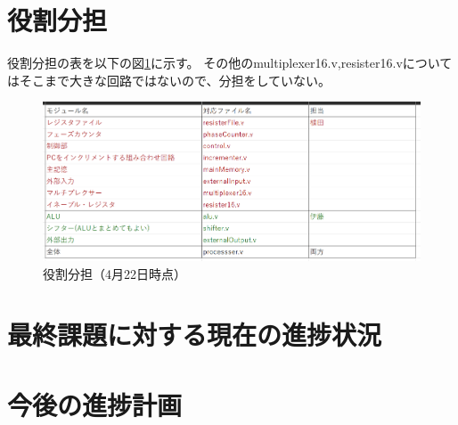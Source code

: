\documentclass[a4j,titlepage]{jarticle}
\begin{document}
\section{役割分担}

役割分担の表を以下の図\ref{rolesDivision0422}に示す。
その他のmultiplexer16.v,resister16.vについてはそこまで大きな回路ではないので、分担をしていない。



\begin{figure}[H]
    \begin{center}
        \includegraphics[scale = 0.5]{rolesDivision0422.png}
    \end{center}
    \caption{役割分担（4月22日時点）}
    \label{rolesDivision0422}
\end{figure}

\section{最終課題に対する現在の進捗状況}

\section{今後の進捗計画}
\end{document}
